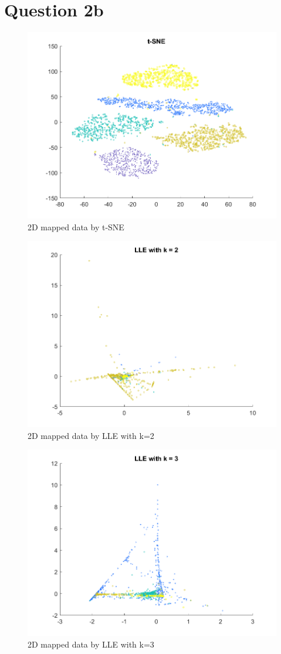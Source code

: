 \documentclass{article}
\begin{document}
\section*{Question 2b}
{
    \begin{figure}[H]
        \centering
        \includegraphics[width = 0.8\linewidth]{Q2/t-SNE.png}
        \caption{2D mapped data by t-SNE}
    \end{figure}

    \begin{figure}[H]
        \centering
        \includegraphics[width = 0.8\linewidth]{Q2/LLE_2.png}
        \caption{2D mapped data by LLE with k=2}
    \end{figure}

    \begin{figure}[H]
        \centering
        \includegraphics[width = 0.8\linewidth]{Q2/LLE_3.png}
        \caption{2D mapped data by LLE with k=3}
    \end{figure}

}
\end{document}
